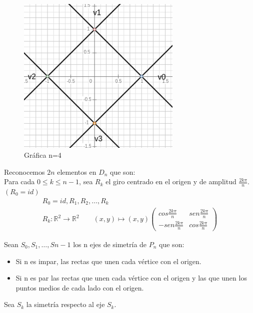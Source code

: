 \documentclass{article}
\begin{document}
\begin{figure}[h]
\centering
\caption{Gráfica n=4}
\includegraphics[scale=1,width=0.7\textwidth]{cuadrado_n_4.png}
\end{figure}

Reconocemos $2n$ elementos en $D_n$ que son: \\

Para cada $0\leq k \leq n-1$, sea $R_k$ el giro centrado en el origen y de amplitud $\frac{2k\pi}{n}$. \\

$(R_0=id)$
\begin{gather*}
R_0=id,R_1,R_2,\ldots,R_k \\
R_k:\mathbb{R}^2\rightarrow \mathbb{R}^2 \qquad (x,y)\mapsto (x,y) 
\begin{pmatrix}
cos \frac{2k\pi}{n} & sen\frac{2k\pi}{n} \\
-sen \frac{2k\pi}{n} & cos \frac{2k\pi}{n}
\end{pmatrix}
\end{gather*}

Sean $S_0,S_1,\ldots,S{n-1}$ los n ejes de simetría de $P_n$ que son:

\begin{itemize}
\item Si n es impar, las rectas que unen cada vértice con el origen.

\item Si n es par las rectas que unen cada vértice con el origen y las que unen los puntos medios de cada lado con el origen.
\end{itemize}

Sea $S_k$ la simetría respecto al eje $S_k$. 
\end{document}
